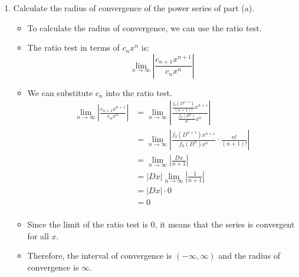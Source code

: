 \documentclass[12pt]{article}
\begin{document}
\begin{enumerate}[leftmargin=\labelsep]
\begin{enumerate}
        \item Calculate the radius of convergence of the power series of part (a).
        \begin{itemize}[label={}]
            \item To calculate the radius of convergence, we can use the ratio test. 
            \item The ratio test in terms of $c_n x^n$ is:
            \begin{equation*}
                \lim_{n \to \infty} \left| \frac{c_{n+1} x^{n+1}}{c_n x^n} \right|
            \end{equation*}
            \item We can substitute $c_n$ into the ratio test.
            \begin{equation*}
                \begin{aligned}
                    \lim_{n \to \infty} \left| \frac{c_{n+1} x^{n+1}}{c_n x^n} \right| &= \lim_{n \to \infty} \left| \frac{\frac{f_0 (D^{n+1})}{(n+1)!} x^{n+1}}{\frac{f_0 (D^n)}{n!} x^n} \right| \\
                    &= \lim_{n \to \infty} \left| \frac{f_0 (D^{n+1}) x^{n+1}}{f_0 (D^n) x^n} \cdot \frac{n!}{(n+1)!} \right| \\
                    &= \lim_{n \to \infty} \left| \frac{Dx}{n+1} \right| \\
                    &= |Dx| \lim_{n \to \infty} \left| \frac{1}{n+1} \right| \\
                    &= |Dx| \cdot 0 \\
                    &= 0 \\
                \end{aligned}
            \end{equation*}
            \item Since the limit of the ratio test is $0$, it means that the series is convergent for all $x$.
            \item Therefore, the interval of convergence is $(-\infty, \infty)$ and the radius of convergence is $\infty$.
        \end{itemize}

        \newpage


\end{enumerate}
\end{enumerate}
\end{document}
